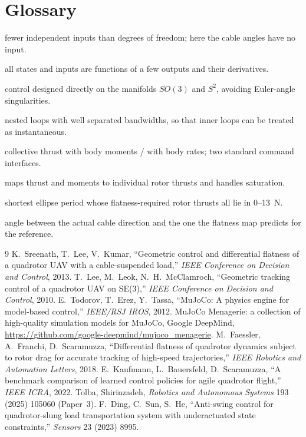 \documentclass[11pt,a4paper]{article}
\begin{document}
\section{Glossary}
\begin{description}[leftmargin=0pt, itemsep=2pt]
\item[Underactuated] fewer independent inputs than degrees of freedom; here the cable angles have no input.
\item[Differential flatness] all states and inputs are functions of a few outputs and their derivatives.
\item[Geometric control] control designed directly on the manifolds $SO(3)$ and $S^2$, avoiding Euler-angle singularities.
\item[Time-scale separation] nested loops with well separated bandwidths, so that inner loops can be treated as instantaneous.
\item[CTBM / CTBR] collective thrust with body moments / with body rates; two standard command interfaces.
\item[Mixer] maps thrust and moments to individual rotor thrusts and handles saturation.
\item[Feasibility boundary $T_0^\ast$] shortest ellipse period whose flatness-required rotor thrusts all lie in 0--13~N.
\item[Dynamic swing] angle between the actual cable direction and the one the flatness map predicts for the reference.
\end{description}

\begin{thebibliography}{9}\small
{} K.~Sreenath, T.~Lee, V.~Kumar, ``Geometric control and differential flatness of a quadrotor UAV
with a cable-suspended load,'' \emph{IEEE Conference on Decision and Control}, 2013.
 T.~Lee, M.~Leok, N.~H.~McClamroch, ``Geometric tracking control of a quadrotor UAV on SE(3),''
\emph{IEEE Conference on Decision and Control}, 2010.
 E.~Todorov, T.~Erez, Y.~Tassa, ``MuJoCo: A physics engine for model-based control,''
\emph{IEEE/RSJ IROS}, 2012.
 MuJoCo Menagerie: a collection of high-quality simulation models for MuJoCo, Google DeepMind,
\url{https://github.com/google-deepmind/mujoco_menagerie}.
 M.~Faessler, A.~Franchi, D.~Scaramuzza, ``Differential flatness of quadrotor dynamics subject to
rotor drag for accurate tracking of high-speed trajectories,'' \emph{IEEE Robotics and Automation Letters}, 2018.
 E.~Kaufmann, L.~Bauersfeld, D.~Scaramuzza, ``A benchmark comparison of learned control policies
for agile quadrotor flight,'' \emph{IEEE ICRA}, 2022.
 Tolba, Shirinzadeh, \emph{Robotics and Autonomous Systems} 193 (2025) 105060 (Paper~3).
 F.~Ding, C.~Sun, S.~He, ``Anti-swing control for quadrotor-slung load transportation system with
underactuated state constraints,'' \emph{Sensors} 23 (2023) 8995.
\end{thebibliography}
\end{document}
